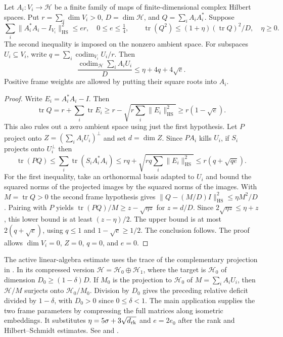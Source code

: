 \begin{lemma}\label{geo:coercivity}
Let \(A_i:V_i\to \mathcal H\) be a finite family of maps of finite-dimensional complex Hilbert spaces. Put \(r=\sum_i\dim V_i>0\), \(D=\dim\mathcal H\), and \(Q=\sum_i A_iA_i^*\). Suppose
\[
 \sum_i\|A_i^*A_i-I_{V_i}\|_{\mathrm{HS}}^2\le er,\quad
 0\le e\le\tfrac14,\qquad
 \operatorname{tr}(Q^2)\le (1+\eta)(\operatorname{tr}Q)^2/D,\quad \eta\ge0.
\]
The second inequality is imposed on the nonzero ambient space. For subspaces \(U_i\subseteq V_i\), write \(q=\sum_i\operatorname{codim}_{V_i}U_i/r\). Then
\[
 \frac{\operatorname{codim}_{\mathcal H}\sum_i A_iU_i}{D}
       \le\eta+4q+4\sqrt e.
\]
Positive frame weights are allowed by putting their square roots into \(A_i\).
\end{lemma}
\begin{proof}
Write \(E_i=A_i^*A_i-I\). Then
\[
 \operatorname{tr}Q=r+\sum_i\operatorname{tr}E_i
 \ge r-\sqrt{r\sum_i\|E_i\|_{\mathrm{HS}}^2}
 \ge r(1-\sqrt e).
\]
This also rules out a zero ambient space using just the first hypothesis. Let \(P\) project onto \(Z=(\sum_i A_iU_i)^\perp\) and set \(d=\dim Z\). Since \(P A_i\) kills \(U_i\), if \(S_i\) projects onto \(U_i^\perp\) then
\[
 \operatorname{tr}(PQ)\le\sum_i\operatorname{tr}(S_iA_i^*A_i)
 \le rq+\sqrt{rq\sum_i\|E_i\|_{\mathrm{HS}}^2}
 \le r(q+\sqrt{qe}).
\]
For the first inequality, take an orthonormal basis adapted to \(U_i\) and bound the squared norms of the projected images by the squared norms of the images. With \(M=\operatorname{tr}Q>0\) the second frame hypothesis gives \(\|Q-(M/D)I\|_{\mathrm{HS}}^2\le\eta M^2/D\). Pairing with \(P\) yields \(\operatorname{tr}(PQ)/M\ge z-\sqrt{\eta z}\) for \(z=d/D\). Since \(2\sqrt{\eta z}\le\eta+z\), this lower bound is at least \((z-\eta)/2\). The upper bound is at most \(2(q+\sqrt e)\), using \(q\le1\) and \(1-\sqrt e\ge 1/2\). The conclusion follows. The proof allows \(\dim V_i=0\), \(Z=0\), \(q=0\), and \(e=0\).
\end{proof}

The active linear-algebra estimate uses the trace of the complementary projection in . In its compressed version \(\mathcal H=\mathcal H_0\oplus\mathcal H_1\), where the target is \(\mathcal H_0\) of dimension \(D_0\ge(1-\delta)D\). If \(M_0\) is the projection to \(\mathcal H_0\) of \(M=\sum_i A_iU_i\), then \(\mathcal H/M\) surjects onto \(\mathcal H_0/M_0\). Division by \(D_0\) gives the preceding relative deficit divided by \(1-\delta\), with \(D_0>0\) since \(0\le\delta<1\). The main application supplies the two frame parameters by compressing the full matrices along isometric embeddings. It substitutes \(\eta=5\sigma+3\sqrt{d_{\rm rk}}\) and \(e=2e_0\) after the rank and Hilbert--Schmidt estimates. See  and .

